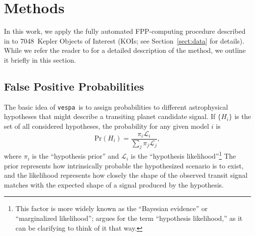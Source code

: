 \documentclass{emulateapj}
\newcommand{\eqlabel}[1]{\label{eq:#1}}
\newcommand{\sectionname}{Section}
\newcommand{\Sect}[1]{\sectionname~\ref{sect:#1}}
\newcommand{\sect}[1]{\Sect{#1}}
\newcommand{\sectlabel}[1]{\label{sect:#1}}
\newcommand{\ncalc}{7048}
\newcommand{\vespa}{\texttt{vespa}}
\begin{document}

\section{Methods}
\sectlabel{methods}

In this work, we apply the fully automated FPP-computing procedure
described in \citet[][hereafter ]{Morton:2012}
to \ncalc\ Kepler Objects of Interest (KOIs; see \sect{data} for
details).  While we refer the reader to  for a
detailed description of the method, we outline it briefly in this
section.  


\subsection{False Positive Probabilities}
\sectlabel{methods:fpp}

The basic idea of \vespa\ is to assign probabilities to different
astrophysical hypotheses that might describe a transiting planet
candidate signal.  If $\{H_i\}$ is the set of all considered
hypotheses, the probability for any given model $i$ is
\begin{equation}
  \eqlabel{prob}
  \mathrm{Pr}\left(H_i\right) = \frac{\pi_i \mathcal
    L_i}{\displaystyle \sum_j \pi_j \mathcal L_j},
\end{equation}
where $\pi_i$ is the ``hypothesis prior'' and $\mathcal L_i$ is the
``hypothesis likelihood''\footnote{This factor is more widely known as
  the ``Bayesian evidence'' or ``marginalized likelihood'';
  \citet{Morton:2014b} argues for the term ``hypothesis likelihood,''
  as it can be clarifying to think of it that way.}
The prior represents how intrinsically probable the hypothesized
scenario is to exist, and the likelihood represents how closely the
shape of the observed transit signal matches with the expected shape
of a signal produced by the hypothesis.
\end{document}

